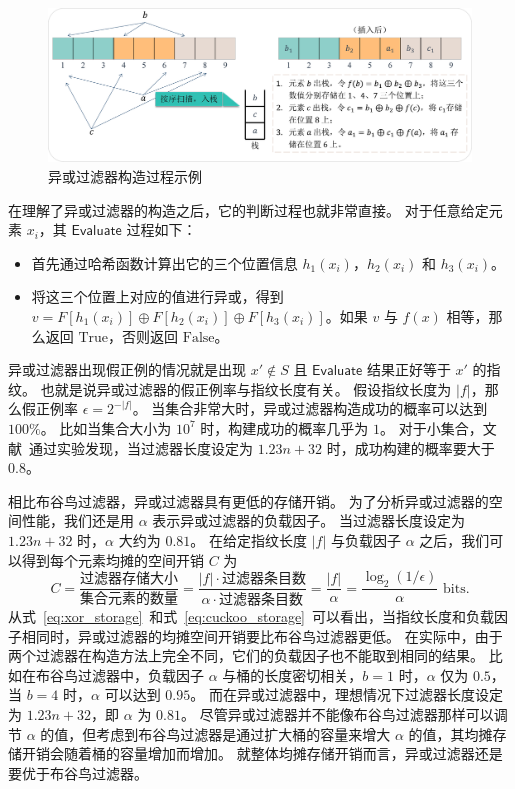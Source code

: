 \begin{figure}[ht]
  \centering
  \includegraphics[width=\textwidth]{figures/xor_exp.pdf}
  \caption{异或过滤器构造过程示例}
  \label{fig:xor_construc}
\end{figure}


在理解了异或过滤器的构造之后，它的判断过程也就非常直接。
对于任意给定元素 $x_i$，其 $\mathsf{Evaluate}$ 过程如下：
\begin{itemize}
  \item 首先通过哈希函数计算出它的三个位置信息 $h_1(x_i)$，$h_2(x_i)$ 和 $h_3(x_i)$。
  \item 将这三个位置上对应的值进行异或，得到 $v = F[h_1(x_i)] \oplus F[h_2(x_i)] \oplus F[h_3(x_i)]$。如果 $v$ 与 $f(x)$ 相等，那么返回 $\mbox{True}$，否则返回 $\mbox{False}$。
\end{itemize}

异或过滤器出现假正例的情况就是出现 $x'\notin S$ 且 $\mathsf{Evaluate}$ 结果正好等于 $x'$ 的指纹。
也就是说异或过滤器的假正例率与指纹长度有关。
假设指纹长度为 $|f|$，那么假正例率 $\epsilon = 2^{-|f|}$。
当集合非常大时，异或过滤器构造成功的概率可以达到 $100\%$。
比如当集合大小为 $10^7$ 时，构建成功的概率几乎为 $1$。
对于小集合，文献~\cite{graf2020xor}通过实验发现，当过滤器长度设定为 $1.23 n + 32$ 时，成功构建的概率要大于 $0.8$。

相比布谷鸟过滤器，异或过滤器具有更低的存储开销。
为了分析异或过滤器的空间性能，我们还是用 $\alpha$ 表示异或过滤器的负载因子。
当过滤器长度设定为 $1.23n + 32$ 时，$\alpha$ 大约为 $0.81$。
在给定指纹长度 $|f|$ 与负载因子 $\alpha$ 之后，我们可以得到每个元素均摊的空间开销 $C$ 为
\begin{equation}
  C = \frac{\mbox{过滤器存储大小}}{\mbox{集合元素的数量}} = \frac{|f| \cdot \mbox{过滤器条目数}}{\alpha \cdot \mbox{过滤器条目数}} = \frac{|f|}{\alpha} = \frac{\log_2(1/\epsilon)}{\alpha} \mbox{ bits}.
  \label{eq:xor_storage}
\end{equation}
从式~\ref{eq:xor_storage}~和式~\ref{eq:cuckoo_storage}~可以看出，当指纹长度和负载因子相同时，异或过滤器的均摊空间开销要比布谷鸟过滤器更低。
在实际中，由于两个过滤器在构造方法上完全不同，它们的负载因子也不能取到相同的结果。
比如在布谷鸟过滤器中，负载因子 $\alpha$ 与桶的长度密切相关，$b=1$ 时，$\alpha$ 仅为 $0.5$，当 $b=4$ 时，$\alpha$ 可以达到 $0.95$。
而在异或过滤器中，理想情况下过滤器长度设定为 $1.23n + 32$，即 $\alpha$ 为 $0.81$。
尽管异或过滤器并不能像布谷鸟过滤器那样可以调节 $\alpha$ 的值，但考虑到布谷鸟过滤器是通过扩大桶的容量来增大 $\alpha$ 的值，其均摊存储开销会随着桶的容量增加而增加。
就整体均摊存储开销而言，异或过滤器还是要优于布谷鸟过滤器。

